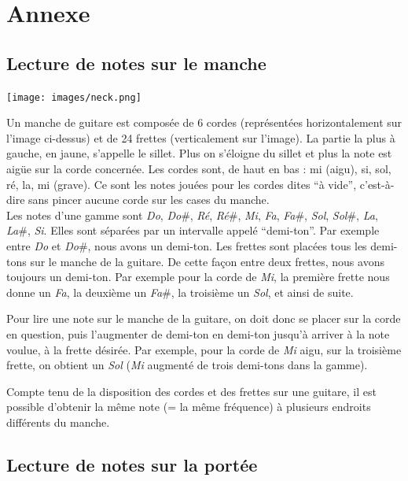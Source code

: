\documentclass{scrreprt}
\begin{document}
\chapter{Annexe}

\section{Lecture de notes sur le manche}


\bigbreak
\texttt{[image: images/neck.png]}
\bigbreak

Un manche de guitare est composée de 6 cordes (représentées horizontalement sur l'image ci-dessus) et de 24 frettes (verticalement sur l'image).
La partie la plus à gauche, en jaune, s'appelle le sillet. Plus on s'éloigne du sillet et plus la note est aigüe sur la corde concernée.
Les cordes sont, de haut en bas : mi (aigu), si, sol, ré, la, mi (grave). Ce sont les notes jouées pour les cordes dites \enquote{à vide}, c'est-à-dire sans pincer aucune corde sur les cases du manche.\\

Les notes d'une gamme sont \textit{Do}, \textit{Do}\#, \textit{Ré}, \textit{Ré}\#, \textit{Mi}, \textit{Fa}, \textit{Fa}\#, \textit{Sol}, \textit{Sol}\#, \textit{La}, \textit{La}\#, \textit{Si}. Elles sont séparées par un intervalle appelé \enquote{demi-ton}. Par exemple entre \textit{Do} et \textit{Do}\#, nous avons un demi-ton.
Les frettes sont placées tous les demi-tons sur le manche de la guitare. De cette façon entre deux frettes, nous avons toujours un demi-ton. Par exemple pour la corde de \textit{Mi}, la première frette nous donne un \textit{Fa}, la deuxième un \textit{Fa}\#, la troisième un \textit{Sol}, et ainsi de suite.

Pour lire une note sur le manche de la guitare, on doit donc se placer sur la corde en question, puis l'augmenter de demi-ton en demi-ton jusqu'à arriver à la note voulue, à la frette désirée.
Par exemple, pour la corde de \textit{Mi} aigu, sur la troisième frette, on obtient un \textit{Sol} (\textit{Mi} augmenté de trois demi-tons dans la gamme).

Compte tenu de la disposition des cordes et des frettes sur une guitare, il est possible d'obtenir la même note (= la même fréquence) à plusieurs endroits différents du manche.

\newpage
\section{Lecture de notes sur la portée}
\end{document}
